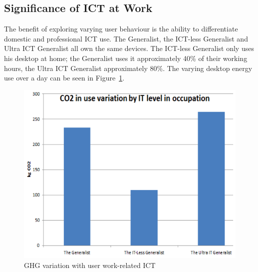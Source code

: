 \documentclass[conference]{IEEEtran}
\begin{document}


\subsection{Significance of ICT at Work}

The benefit of exploring varying user behaviour is the ability to
differentiate domestic and professional ICT use. The Generalist, the
ICT-less Generalist and Ultra ICT Generalist all own the same
devices. The ICT-less Generalist only uses his desktop at home; the
Generalist uses it approximately 40\% of their working hours, the
Ultra ICT Generalist approximately 80\%. The varying desktop energy use
over a day can be seen in
Figure~\ref{fig:ghgvariation_userworkrelatedit}.

\begin{figure}[!ht]
\centering
\includegraphics[width=0.9\columnwidth]{images/ghgvariation_userworkrelatedit.png}
\caption{GHG variation with user work-related ICT}
\label{fig:ghgvariation_userworkrelatedit} 
\end{figure}
\end{document}
